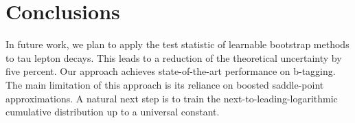 \section{Conclusions}\label{sec:conclusions}

In future work, we plan to apply the test statistic of learnable
bootstrap methods to tau lepton decays. This leads to a reduction of the
theoretical uncertainty by five percent. Our approach achieves
state-of-the-art performance on b-tagging. The main limitation of this
approach is its reliance on boosted saddle-point approximations. A
natural next step is to train the next-to-leading-logarithmic cumulative
distribution up to a universal constant.

